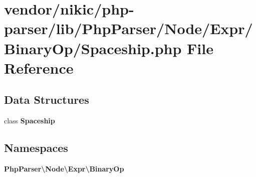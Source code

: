 \section{vendor/nikic/php-\/parser/lib/\+Php\+Parser/\+Node/\+Expr/\+Binary\+Op/\+Spaceship.php File Reference}
\label{_spaceship_8php}
\subsection*{Data Structures}
\begin{DoxyCompactItemize}
\item 
class {\bf Spaceship}
\end{DoxyCompactItemize}
\subsection*{Namespaces}
\begin{DoxyCompactItemize}
\item 
 {\bf Php\+Parser\textbackslash{}\+Node\textbackslash{}\+Expr\textbackslash{}\+Binary\+Op}
\end{DoxyCompactItemize}
